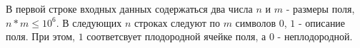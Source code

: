 В первой строке входных данных содержаться два числа $n$ и $m$ - размеры поля, $n * m \le 10 ^ 6$.
В следующих $n$ строках следуют по $m$ символов $0$, $1$ - описание поля. При этом, $1$ соответсвует плодородной ячейке поля, а $0$ - неплодородной.